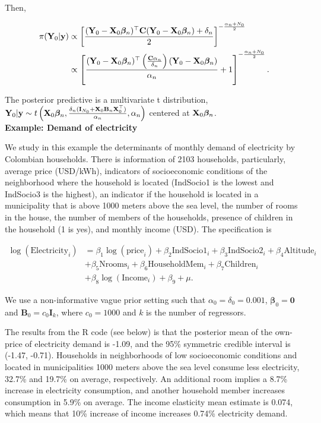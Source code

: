 Then,

\begin{align*}
	\pi({\bf{Y}}_0|{\bf{y}})&\propto\left[\frac{({\bf{Y}}_0-{\mathbf{X}}_0\bm{\beta}_n)^{\top}{\bf{C}}({\bf{Y}}_0-{\mathbf{X}}_0\bm{\beta}_n)+\delta_n}{2}\right]^{-\frac{\alpha_n+N_0}{2}}\\
	&\propto\left[\frac{({\bf{Y}}_0-{\mathbf{X}}_0\bm{\beta}_n)^{\top}\left(\frac{{\bf{C}}\alpha_n}{\delta_n}\right)({\bf{Y}}_0-{\mathbf{X}}_0\bm{\beta}_n)}{\alpha_n}+1\right]^{-\frac{\alpha_n+N_0}{2}}.
\end{align*}

The posterior predictive is a multivariate t distribution, ${\bf{Y}}_0|{\bf{y}}\sim t\left({\bf{X}}_0\bm{\beta}_n,\frac{\delta_n({\bf{I}}_{N_0}+{\bf{X}}_0{\bf{B}}_n{\bf{X}}_0^{\top})}{\alpha_n},\alpha_n\right)$ centered at ${\bf{X}}_0\bm{\beta}_n$.\\

\textbf{Example: Demand of electricity}

We study in this example the determinants of monthly demand of electricity by Colombian households. There is information of 2103 households, particularly, average price (USD/kWh), indicators of socioeconomic conditions of the neighborhood where the household is located (IndSocio1 is the lowest and IndSocio3 is the highest), an indicator if the household is located in a municipality that is above 1000 meters above the sea level, the number of rooms in the house, the number of members of the households, presence of children in the household (1 is yes), and monthly income (USD). The specification is

\begin{align*}
	\log(\text{Electricity}_i) & = \beta_1\log(\text{price}_i) + \beta_2\text{IndSocio1}_i + \beta_3\text{IndSocio2}_i + \beta_4\text{Altitude}_i \\
	& + \beta_5\text{Nrooms}_i + \beta_6\text{HouseholdMem}_i + \beta_7\text{Children}_i\\
	& + \beta_8\log(\text{Income}_i) + \beta_9 + \mu.
\end{align*}

We use a non-informative vague prior setting such that $\alpha_0=\delta_0=0.001$, $\bm{\beta}_0=\mathbf{0}$ and $\mathbf{B}_0=c_0\mathbf{I}_k$, where $c_0=1000$ and $k$ is the number of regressors. 

The results from the R code (see below) is that the posterior mean of the own-price of electricity demand is -1.09, and the 95\% symmetric credible interval is (-1.47, -0.71). Households in neighborhoods of low socioeconomic conditions and located in municipalities 1000 meters above the sea level consume less electricity, 32.7\% and 19.7\% on average, respectively. An additional room implies a 8.7\% increase in electricity consumption, and another household member increases consumption in 5.9\% on average. The income elasticity mean estimate is 0.074, which means that 10\% increase of income increases 0.74\% electricity demand.

